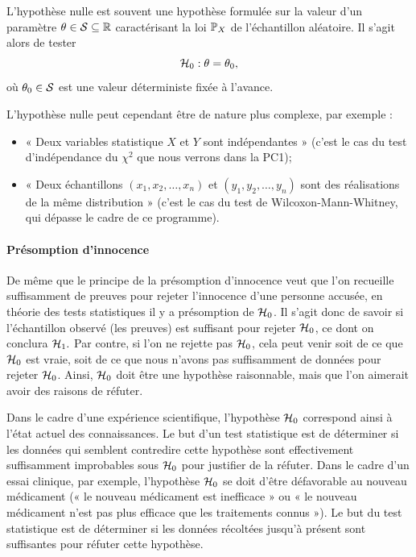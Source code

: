 L'hypothèse nulle est souvent une hypothèse formulée sur la valeur d'un paramètre
$\theta \in \mathcal{S} \subseteq \mathbb{R}$ caractérisant la loi $\mathbb{P}_X$ de l'échantillon
aléatoire. Il s'agit alors de tester
\begin{equation}
  \label{eq:h0}
  \mathcal{H}_0: \theta = \theta_0,
\end{equation}
où $\theta_0 \in \mathcal{S}$ est une valeur déterministe fixée à l'avance.

L'hypothèse nulle peut cependant être de nature plus complexe, par exemple :
\begin{itemize}
\item « Deux variables statistique $X$ et $Y$ sont indépendantes » (c'est le
  cas du test d'indépendance du $\chi^2$ que nous verrons dans la PC1);
\item « Deux échantillons $(x_1, x_2, \dots, x_n)$ et $(y_1, y_2, \dots, y_n)$
  sont des réalisations de la même distribution » (c'est le cas du test de
  Wilcoxon-Mann-Whitney, qui dépasse le cadre de ce programme).
\end{itemize}

\paragraph{Présomption d'innocence} De même que le principe de la présomption
d'innocence veut que l'on recueille suffisamment de preuves pour rejeter
l'innocence d'une personne accusée, en théorie des tests statistiques il y a
présomption de $\mathcal{H}_0$. Il s'agit donc de savoir si l'échantillon observé (les
preuves) est suffisant pour rejeter $\mathcal{H}_0$, ce dont on conclura $\mathcal{H}_1.$ Par
contre, si l'on ne rejette pas $\mathcal{H}_0$, cela peut venir soit de ce que $\mathcal{H}_0$
est vraie, soit de ce que nous n'avons pas suffisamment de données pour rejeter
$\mathcal{H}_0$. Ainsi, $\mathcal{H}_0$ doit être une hypothèse raisonnable, mais que l'on
aimerait avoir des raisons de réfuter.

Dans le cadre d'une expérience scientifique, l'hypothèse $\mathcal{H}_0$ correspond
ainsi à l'état actuel des connaissances. Le but d'un test statistique est de
déterminer si les données qui semblent contredire cette hypothèse sont
effectivement suffisamment improbables sous $\mathcal{H}_0$ pour justifier de la
réfuter.
Dans le cadre d'un essai clinique, par exemple, l'hypothèse $\mathcal{H}_0$ se doit
d'être défavorable au nouveau médicament (« le nouveau médicament est
inefficace » ou « le nouveau médicament n'est pas plus efficace que les
traitements connus »). Le but du test statistique est de déterminer si les
données récoltées jusqu'à présent sont suffisantes pour réfuter cette
hypothèse.

